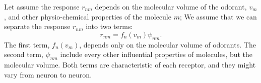 \documentclass[a1paper,fontscale=0.5]{baposter} %
\begin{document}
\begin{poster}
{Let assume the response $r_{nm}$ depends on the molecular volume of the odorant, $v_m$, and other physio-chemical properties of the molecule $m$; 
We assume that we can separate the response $r_{nm}$ into two terms:
\begin{equation}
	r_{nm} = f_n(v_m) \psi_{nm}. \nonumber
	\label{eqn:factors}
\end{equation}
The first term, $f_n(v_m)$, depends only on the molecular volume of odorants.
The second term, $\psi_{nm}$ include every other influential properties of molecules, but the molecular volume.
Both terms are characteristic of each receptor, and they might vary from neuron to neuron.
}




%
%
%


\end{poster}
\end{document}

